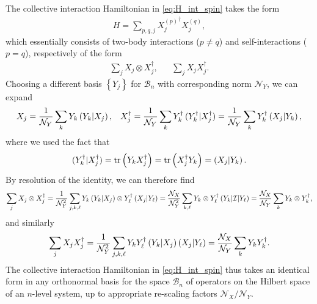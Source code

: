 \documentclass[nofootinbib,notitlepage,11pt]{revtex4-2}
\newcommand{\f}[2]{\dfrac{#1}{#2}} %
\newcommand{\p}[1]{\left(#1\right)} %
\renewcommand{\set}[1]{\left\{#1\right\}} %
\newcommand{\1}{\mathds{1}}
\newcommand{\B}{\mathcal{B}}
\newcommand{\I}{\mathcal{I}}
\newcommand{\N}{\mathcal{N}}
\def\obk#1{\mathinner{({#1})}}
\begin{document}
The collective interaction Hamiltonian in \eqref{eq:H_int_spin} takes
the form
\begin{align}
  H = \sum_{p,q,j} {X_j^{(p)}}^\dag X_j^{(q)},
\end{align}
which essentially consists of two-body interactions ($p\ne q$) and
self-interactions ($p=q$), respectively of the form
\begin{align}
  \sum_j X_j \otimes X_j^\dag,
  &&
  \sum_j X_j X_j^\dag.
\end{align}
Choosing a different basis $\set{Y_j}$ for $\B_n$ with corresponding
norm $\N_Y$, we can expand
\begin{align}
  X_j = \f1{\N_Y} \sum_k Y_k \obk{Y_k|X_j},
  &&
  X_j^\dag = \f1{\N_Y} \sum_k Y_k^\dag \obk{Y_k^\dag|X_j^\dag}
  = \f1{\N_Y} \sum_k Y_k^\dag \obk{X_j|Y_k},
\end{align}
where we used the fact that
\begin{align}
  \obk{Y_k^\dag|X_j^\dag}
  = \tr\p{Y_k X_j^\dag}
  = \tr\p{X_j^\dag Y_k}
  = \obk{X_j|Y_k}.
\end{align}
By resolution of the identity, we can therefore find
\begin{align}
  \sum_j X_j \otimes X_j^\dag
  = \f1{\N_Y^2} \sum_{j,k,\ell} Y_k \obk{Y_k|X_j}
  \otimes Y_\ell^\dag \obk{X_j|Y_\ell}
  = \f{\N_X}{\N_Y^2} \sum_{k,\ell} Y_k \otimes Y_\ell^\dag
  \obk{Y_k|\I|Y_\ell}
  = \f{\N_X}{\N_Y} \sum_k Y_k \otimes Y_k^\dag,
\end{align}
and similarly
\begin{align}
  \sum_j X_j X_j^\dag
  = \f1{\N_Y^2} \sum_{j,k,\ell} Y_k Y_\ell^\dag
  \obk{Y_k|X_j} \obk{X_j|Y_\ell}
  = \f{\N_X}{\N_Y} \sum_k Y_k Y_k^\dag.
\end{align}
The collective interaction Hamiltonian in \eqref{eq:H_int_spin} thus
takes an identical form in any orthonormal basis for the space $\B_n$
of operators on the Hilbert space of an $n$-level system, up to
appropriate re-scaling factors $\N_X/\N_Y$.


\end{document}
